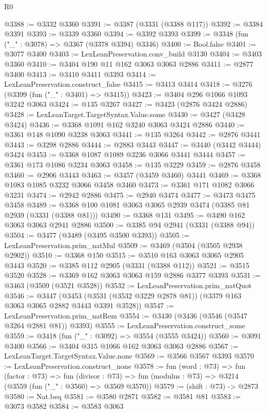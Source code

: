 \begin{lexlean}{R0}
\begin{coremodule}
@3388 := @3332 @3360
@3391 := @3387 (@3331 (@3388 @117))
@3392 := @3384 @3391
@3393 := @3339 @3360
@3394 := @3392 @3393
@3399 := @3348 (fun ("_" : @3078) => @3367 (@3378 @3394) @3346)
@3400 := Bool.false
@3401 := @3077 @3400
@3403 := LexLeanPreservation.conv_build @3130
@3404 := @3403 @3360
@3410 := @3404 @190 @11 @162 @3063 @3063 @2886
@3411 := @2877 @3400
@3413 := @3410 @3411 @3393
@3414 := LexLeanPreservation.construct_false
@3415 := @3413 @3414
@3418 := @3276 (@3399 (fun ("_" : @3401) => @3415))
@3423 := @3404 @296 @1066 @1093 @3242 @3063
@3424 := @135 @3267
@3427 := @3423 (@2876 @3424 @2886)
@3428 := LexLeanTarget.TargetSyntax.Value.some
@3430 := @3427 (@3428 @3424)
@3436 := @3368 @1091 @162 @3240 @3063 @3424 @2886
@3440 := @3361 @148 @1090 @3238 @3063
@3441 := @135 @3264
@3442 := @2876 @3441
@3443 := @3298 @2886
@3444 := @2883 @3443
@3447 := @3440 (@3442 @3444) @3424
@3453 := @3368 @1087 @1089 @3236 @3066 @3441 @3444
@3457 := @3361 @173 @1086 @3234 @3063
@3458 := @135 @3229
@3459 := @2876 @3458
@3460 := @2906 @3443
@3463 := @3457 (@3459 @3460) @3441
@3469 := @3368 @1083 @1085 @3232 @3066 @3458 @3460
@3473 := @3361 @171 @1082 @3066 @3231
@3474 := @2942 @2886
@3475 := @2940 @3474
@3477 := @3473 @3475 @3458
@3489 := @3368 @100 @1081 @3063 @3065 @2939 @3474 (@3385 @81 @2939 (@3331 (@3388 @81)))
@3490 := @3368 @131
@3495 := @3490 @162 @3063 @3063 @2941 @2886
@3500 := @3385 @94 @2941 (@3331 (@3388 @94))
@3504 := @3477 (@3489 (@3495 @3500 @3393))
@3505 := LexLeanPreservation.prim_natMul
@3509 := @3469 (@3504 (@3505 @2938 @2902))
@3510 := @3368 @150
@3515 := @3510 @163 @3063 @3065 @2905 @3443
@3520 := @3385 @112 @2905 (@3331 (@3388 @112))
@3521 := @3515 @3520
@3528 := @3369 @162 @3063 @3063 @159 @2886 @3377 @3393
@3531 := @3463 (@3509 (@3521 @3528))
@3532 := LexLeanPreservation.prim_natQuot
@3546 := @3447
    (@3453 (@3531 (@3532 @3229 @2878 @81)) (@3379 @163 @3063 @3065 @2882 @3443 @3391 @3528))
@3547 := LexLeanPreservation.prim_natRem
@3554 := @3430 (@3436 (@3546 (@3547 @3264 @2881 @81)) @3393)
@3555 := LexLeanPreservation.construct_some
@3559 := @3418 (fun ("_" : @3092) => @3554 (@3555 @3424))
@3560 := @3091 @3400
@3566 := @3404 @315 @1066 @162 @3063 @3063 @2886
@3567 := LexLeanTarget.TargetSyntax.Value.none
@3569 := @3566 @3567 @3393
@3570 := LexLeanPreservation.construct_none
@3578 := fun (word : @73) =>
  fun (factor : @73) =>
  fun (divisor : @73) => fun (modulus : @73) => @3214 (@3559 (fun ("_" : @3560) => @3569 @3570))
@3579 := (shift : @73) -> @2873
@3580 := Nat.beq
@3581 := @3580 @2871
@3582 := @3581 @81
@3583 := @3073 @3582
@3584 := @3583 @3063

\end{coremodule}
\end{lexlean}
